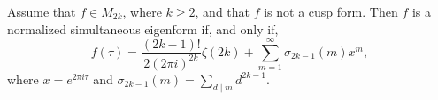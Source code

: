 Assume that $f \in M_{2k}$, where $k \geq 2$, and that $f$ is not a cusp form. Then $f$ is a normalized simultaneous eigenform if, and only if,
$$f(\tau) = \frac{(2k-1)!}{2(2\pi i)^{2k}} \zeta(2k) + \sum_{m=1}^{\infty} \sigma_{2k-1}(m) x^m,$$
where $x = e^{2\pi i\tau}$ and $\sigma_{2k-1}(m) = \sum_{d \mid m} d^{2k-1}$.
